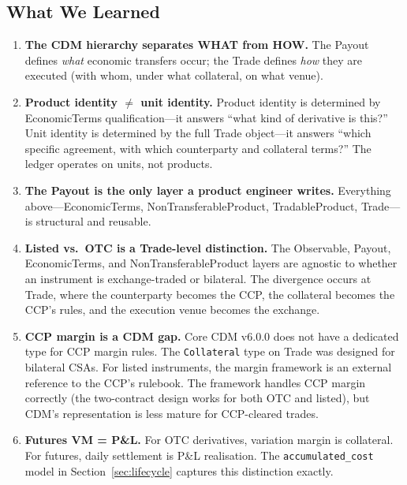 \documentclass[11pt,a4paper]{article}
\begin{document}
\subsection{What We Learned}
\label{sec:cdm-lessons}

\begin{enumerate}
\item \textbf{The CDM hierarchy separates WHAT from HOW.} The Payout defines \textit{what} economic transfers occur; the Trade defines \textit{how} they are executed (with whom, under what collateral, on what venue).

\item \textbf{Product identity $\neq$ unit identity.} Product identity is determined by EconomicTerms qualification---it answers ``what kind of derivative is this?'' Unit identity is determined by the full Trade object---it answers ``which specific agreement, with which counterparty and collateral terms?'' The ledger operates on units, not products.

\item \textbf{The Payout is the only layer a product engineer writes.} Everything above---EconomicTerms, NonTransferableProduct, TradableProduct, Trade---is structural and reusable.

\item \textbf{Listed vs.\ OTC is a Trade-level distinction.} The Observable, Payout, EconomicTerms, and NonTransferableProduct layers are agnostic to whether an instrument is exchange-traded or bilateral. The divergence occurs at Trade, where the counterparty becomes the CCP, the collateral becomes the CCP's rules, and the execution venue becomes the exchange.

\item \textbf{CCP margin is a CDM gap.} Core CDM v6.0.0 does not have a dedicated type for CCP margin rules. The \texttt{Collateral} type on Trade was designed for bilateral CSAs. For listed instruments, the margin framework is an external reference to the CCP's rulebook. The framework handles CCP margin correctly (the two-contract design works for both OTC and listed), but CDM's representation is less mature for CCP-cleared trades.

\item \textbf{Futures VM = P\&L.} For OTC derivatives, variation margin is collateral. For futures, daily settlement is P\&L realisation. The \texttt{accumulated\_cost} model in Section~\ref{sec:lifecycle} captures this distinction exactly.


\end{enumerate}
\end{document}
